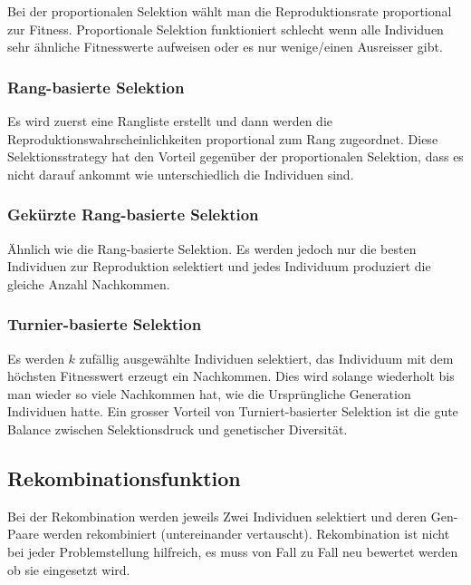         Bei der proportionalen Selektion wählt man die Reproduktionsrate proportional zur Fitness.
        Proportionale Selektion funktioniert schlecht wenn alle Individuen sehr ähnliche Fitnesswerte aufweisen oder es nur wenige/einen Ausreisser gibt.

      \subsubsection{Rang-basierte Selektion}

        Es wird zuerst eine Rangliste erstellt und dann werden die Reproduktionswahrscheinlichkeiten proportional zum Rang zugeordnet.
        Diese Selektionsstrategy hat den Vorteil gegenüber der proportionalen Selektion,
        dass es nicht darauf ankommt wie unterschiedlich die Individuen sind.

      \subsubsection{Gekürzte Rang-basierte Selektion}

        Ähnlich wie die Rang-basierte Selektion.
        Es werden jedoch nur die besten Individuen zur Reproduktion selektiert und
        jedes Individuum produziert die gleiche Anzahl Nachkommen.

      \subsubsection{Turnier-basierte Selektion\label{par:Turnier}}

        Es werden \(k\) zufällig ausgewählte Individuen selektiert,
        das Individuum mit dem höchsten Fitnesswert erzeugt ein Nachkommen.
        Dies wird solange wiederholt bis man wieder so viele Nachkommen hat,
        wie die Ursprüngliche Generation Individuen hatte.
        Ein grosser Vorteil von Turniert-basierter Selektion ist die gute Balance zwischen
        Selektionsdruck und genetischer Diversität.

    \subsection{Rekombinationsfunktion}

        Bei der Rekombination werden jeweils Zwei Individuen selektiert und
        deren Gen-Paare werden rekombiniert (untereinander vertauscht).
        Rekombination ist nicht bei jeder Problemstellung hilfreich,
        es muss von Fall zu Fall neu bewertet werden ob sie eingesetzt wird.

